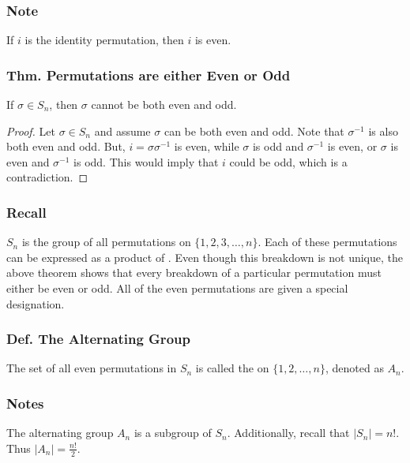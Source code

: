 \subsubsection*{Note}
If $i$ is the identity permutation, then $i$ is even.

\subsubsection{Thm. Permutations are either Even or Odd}
If $\sigma \in S_n$, then $\sigma$ cannot be both even and odd.
\begin{proof}
    Let $\sigma \in S_n$ and assume $\sigma$ can be both even and odd. Note that $\sigma^{-1}$ is also both even and odd. But, $i = \sigma\sigma^{-1}$ is even, while $\sigma$ is odd and $\sigma^{-1}$ is even, or $\sigma$ is even and $\sigma^{-1}$ is odd. This would imply that $i$ could be odd, which is a contradiction.
\end{proof}

\subsubsection*{Recall}
$S_n$ is the group of all permutations on $\{1,2,3,\ldots,n\}$. Each of these permutations can be expressed as a product of . Even though this breakdown is not unique, the above theorem shows that every breakdown of a particular permutation must either be even or odd. All of the even permutations are given a special designation.

\subsubsection{Def. The Alternating Group}
The set of all even permutations in $S_n$ is called the  on $\{1,2,\ldots,n\}$, denoted as $A_n$.

\subsubsection*{Notes}
The alternating group $A_n$ is a subgroup of $S_n$. Additionally, recall that $|S_n| = n!$. Thus $|A_n| = \frac{n!}{2}$.